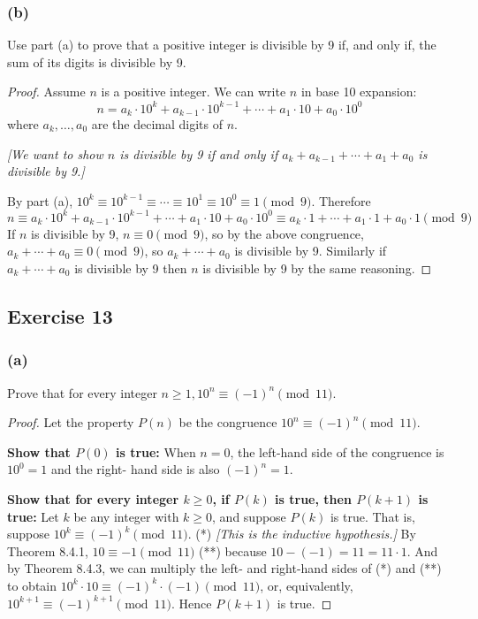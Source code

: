 \documentclass[14pt]{extarticle}
\begin{document}
\subsubsection{(b)}
Use part (a) to prove that a positive integer is divisible by 9 if, and only if, the sum of its digits is divisible by 9.

\begin{proof}
Assume \(n\) is a positive integer. We can write \(n\) in base 10 expansion:
\[
n = a_k \cdot 10^k + a_{k-1} \cdot 10^{k-1} + \cdots + a_1 \cdot 10 + a_0 \cdot 10^0
\]
where \(a_k, \ldots, a_0\) are the decimal digits of $n$.

{\it [We want to show $n$ is divisible by 9 if and only if \(a_k + a_{k-1} + \cdots +a_1+ a_0\) is divisible by 9.]}

By part (a), \(10^k \equiv 10^{k-1} \equiv \cdots \equiv 10^1 \equiv 10^0 \equiv 1 \pmod 9\). Therefore
\[
n \equiv a_k \cdot 10^k + a_{k-1} \cdot 10^{k-1} + \cdots + a_1 \cdot 10 + a_0 \cdot 10^0 \equiv a_k \cdot 1 + \cdots + 
a_1 \cdot 1 + a_0 \cdot 1 \pmod 9
\]
If \(n\) is divisible by 9, \(n \equiv 0 \pmod 9\), so by the above congruence, \(a_k +\cdots+a_0 \equiv 0 \pmod 9\), 
so \(a_k + \cdots + a_0\) is divisible by 9. Similarly if \(a_k + \cdots + a_0\) is divisible by 9 then $n$ is 
divisible by 9 by the same reasoning.
\end{proof}

\subsection{Exercise 13}
\subsubsection{(a)}
Prove that for every integer \(n \geq 1, 10^n \equiv (-1)^n \pmod{11}\).

\begin{proof}
Let the property \(P(n)\) be the congruence \(10^n \equiv (-1)^n \pmod{11}\).

{\bf Show that \(P(0)\) is true:} When \(n = 0\), the left-hand side of the congruence is \(10^0 = 1\) and the right-
hand side is also \((-1)^n = 1\).

{\bf Show that for every integer \(k \geq 0\), if \(P(k)\) is true, then \(P(k + 1)\) is true:} Let \(k\) be any 
integer with \(k \geq 0\), and suppose \(P(k)\) is true. That is, suppose \(10^k \equiv (-1)^k \pmod{11}\). (*) {\it 
[This is the inductive hypothesis.]} By Theorem 8.4.1, \(10 \equiv -1 \pmod{11}\) (**) because \(10 - (-1) = 11 = 11 
\cdot 1\). And by Theorem 8.4.3, we can multiply the left- and right-hand sides of (*) and (**) to obtain \(10^k \cdot 
10 \equiv (-1)^k \cdot (-1) \pmod{11}\), or, equivalently, \(10^{k+1} \equiv (-1)^{k+1} \pmod{11}\). Hence \(P(k + 1)\) is true.
\end{proof}
\end{document}
